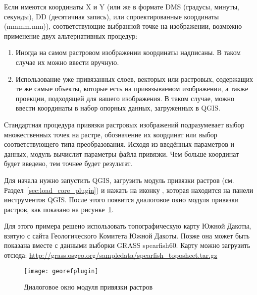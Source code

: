 
Если имеются координаты X и Y (или же в формате DMS (градусы, минуты,
секунды), DD (десятичная запись), или спроектированные координаты
(mmmm.mm)), соответствующие выбранной точке на изображении, возможно
применение двух альтернативных процедур:

\begin{enumerate}
\item Иногда на самом растровом изображении координаты надписаны.
В таком случае их можно ввести вручную.
\item Использование уже привязанных слоев, векторых или растровых,
содержащих те же самые объекты, которые есть на привязываемом
изображении, а также проекции, подходящей для вашего изображения.
В таком случае, можно ввести координаты в набор опорных данных,
загруженных в QGIS.
\end{enumerate}

Стандартная процедура привязки растровых изображений подразумевает выбор
множественных точек на растре, обозначение их координат или выбор
соответствующего типа преобразования. Исходя из введённых параметров и
данных, модуль вычислит параметры файла привязки. Чем больше координат
будет введено, тем точнее будет результат.

Для начала нужно запустить QGIS, загрузить модуль привязки растров
(см. Раздел~\ref{sec:load_core_plugin}) и нажать на иконку
, которая находится на
панели инструментов QGIS. После этого появится диалоговое окно модуля
привязки растров, как показано на рисунке~\ref{fig:georefplugin}.

Для этого примера решено использовать топографическую карту Южной
Дакоты, взятую с сайта Геологического Комитета Южной Дакоты. Позже она
может быть показана вместе с данными выборки GRASS spearfish60. Карту
можно загрузить отсюда:
\url{http://grass.osgeo.org/sampledata/spearfish_toposheet.tar.gz}

\begin{figure}[ht]
\centering
  \texttt{[image: georefplugin]}
  \caption{Диалоговое окно модуля привязки растров \wincaption}\label{fig:georefplugin}
\end{figure}

\label{georeferencer_entering}

